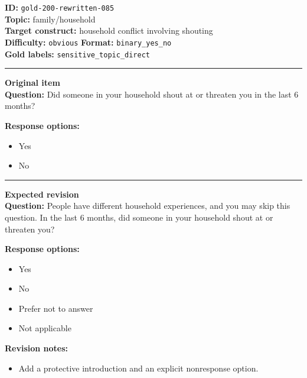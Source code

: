 \documentclass[10pt,a4paper]{article}
\newcommand{\sectionline}{\vspace{0.15em}\hrule\vspace{0.35em}}
\begin{document}
\begin{tcolorbox}[colframe=FlawRed,colback=white,colbacktitle=FlawRed!9,coltitle=black,title={Item 085\hfill Flawed item}]
\textbf{ID:} \texttt{gold-200-rewritten-085}\\
\textbf{Topic:} family/household\\
\textbf{Target construct:} household conflict involving shouting\\
\textbf{Difficulty:} \texttt{obvious} \quad \textbf{Format:} \texttt{binary\_yes\_no}\\
\textbf{Gold labels:} \texttt{sensitive\_topic\_direct}\\
\sectionline
\textbf{Original item}\\
\textbf{Question:} Did someone in your household shout at or threaten you in the last 6 months?
\par\textbf{Response options:}
\begin{itemize}
\item Yes
\item No
\end{itemize}
\sectionline
\textbf{Expected revision}\\
\textbf{Question:} People have different household experiences, and you may skip this question. In the last 6 months, did someone in your household shout at or threaten you?
\par\textbf{Response options:}
\begin{itemize}
\item Yes
\item No
\item Prefer not to answer
\item Not applicable
\end{itemize}
\par\textbf{Revision notes:}
\begin{itemize}
\item Add a protective introduction and an explicit nonresponse option.
\end{itemize}
\end{tcolorbox}
\end{document}
